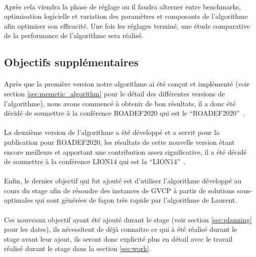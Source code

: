 \documentclass[a4paper,11pt,twoside,french,report]{../common/simplem}
\begin{document}
				\paragraph*{}
					Après cela viendra la phase de réglage ou il faudra alterner entre benchmarks, optimisation logicielle et variation des paramètres et composants de l'algorithme afin optimiser son efficacité. Une fois les réglages terminé, une étude comparative de la performance de l'algorithme sera réalisé.
			\subsection{Objectifs supplémentaires}
				\paragraph*{}
					Après que la première version notre algorithme ai été conçut et implémenté (voir section \ref{sec:memetic_algorithm} pour le détail des différentes versions de l'algorithme), nous avons commencé à obtenir de bon résultats, il a donc été décidé de soumettre à la conférence \acrshort{ROADEF2020} qui est le ``\acrlong{ROADEF2020}''~\cite{ROADEF2020}.
				\paragraph*{}
					La deuxième version de l'algorithme a été développé et a servit pour la publication pour \acrshort{ROADEF2020}, les résultats de cette nouvelle version étant encore meilleurs et apportant une contribution assez significative, il a été décidé de soumettre à la conférence \acrshort{LION14} qui est la ``\acrlong{LION14}''~\cite{LION14}.
				\paragraph*{}
					Enfin, le dernier objectif qui fut ajouté est d'utiliser l'algorithme développé au cours du stage afin de résoudre des instances de \gls{GVCP} à partir de solutions sous-optimales qui sont générées de façon très rapide par l'algorithme de Laurent.
				\paragraph*{}
					Ces nouveaux objectif ayant été ajouté durant le stage (voir section \ref{sec:planning} pour les dates), ils nécessitent de déjà connaitre ce qui à été réalisé durant le stage avant leur ajout, ils seront donc explicité plus en détail avec le travail réalisé durant le stage dans la section \ref{sec:work}.
\end{document}
